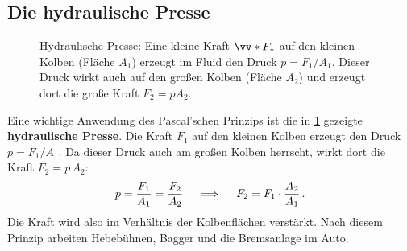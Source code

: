 \subsection{Die hydraulische Presse}\label{subsec: hydraulische_presse}
\begin{figure}[htb]
    \centering
    \caption{Hydraulische Presse: Eine kleine Kraft $\protect\ivecS{F}{1}$ auf den kleinen Kolben (Fläche $A_1$) erzeugt im Fluid den Druck $p = F_1/A_1$. Dieser Druck wirkt auch auf den großen Kolben (Fläche $A_2$) und erzeugt dort die große Kraft $F_2 = p A_2$.}\label{fig: hydraulische_presse}
\end{figure}

Eine wichtige Anwendung des Pascal'schen Prinzips ist die in \cref{fig: hydraulische_presse} gezeigte \textbf{hydraulische Presse}. Die Kraft $F_1$ auf den kleinen Kolben erzeugt den Druck $p = F_1/A_1$. Da dieser Druck auch am großen Kolben herrscht, wirkt dort die Kraft $F_2 = p\,A_2$:
\begin{equation}\label{eq: hydraulische_presse}
    p = \frac{F_1}{A_1} = \frac{F_2}{A_2} \quad \implies \quad F_2 = F_1 \cdot \frac{A_2}{A_1} \,.
\end{equation}
Die Kraft wird also im Verhältnis der Kolbenflächen verstärkt. Nach diesem Prinzip arbeiten Hebebühnen, Bagger und die Bremsanlage im Auto.

